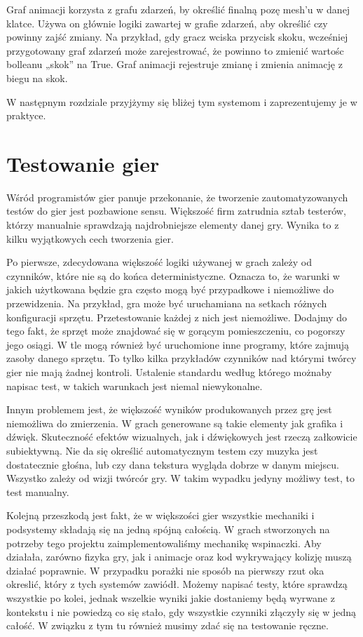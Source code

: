 \documentclass[brudnopis]{xmgr}
\begin{document}
Graf animacji korzysta z grafu zdarzeń, by określić finalną pozę mesh’u w danej klatce. Używa on głównie logiki zawartej w grafie zdarzeń, aby określić czy powinny zajść zmiany. Na przykład, gdy gracz wciska przycisk skoku, wcześniej przygotowany graf zdarzeń może zarejestrować, że powinno to zmienić wartośc bolleanu „skok” na True.  Graf animacji rejestruje zmianę i zmienia animację z biegu na skok.

W następnym rozdziale przyjżymy się bliżej tym systemom i zaprezentujemy je w praktyce.

\chapter{ Testowanie gier}

Wśród programistów gier panuje przekonanie, że tworzenie zautomatyzowanych testów do gier jest pozbawione sensu. Większość firm zatrudnia sztab testerów, którzy manualnie sprawdzają najdrobniejsze elementy danej gry. Wynika to z kilku wyjątkowych cech tworzenia gier.

Po pierwsze, zdecydowana większość logiki używanej w grach zależy od czynników, które nie są do końca deterministyczne. Oznacza to, że warunki w jakich użytkowana będzie gra często mogą być przypadkowe i niemożliwe do przewidzenia. Na przykład, gra może być uruchamiana na setkach różnych konfiguracji sprzętu. Przetestowanie każdej z nich jest niemożliwe. Dodajmy do tego fakt, że sprzęt może znajdować się w gorącym pomieszczeniu, co pogorszy jego osiągi. W tle mogą również być uruchomione inne programy, które zajmują zasoby danego sprzętu. To tylko kilka przykładów czynników nad którymi twórcy gier nie mają żadnej kontroli. Ustalenie standardu według którego możnaby napisac test, w takich warunkach jest niemal niewykonalne.

Innym problemem jest, że większość wyników produkowanych przez grę jest niemożliwa do zmierzenia. 
W grach generowane są takie elementy jak grafika i dźwięk.  Skuteczność efektów wizualnych, jak i dźwiękowych jest rzeczą załkowicie subiektywną. Nie da się określić automatycznym testem czy muzyka jest dostatecznie głośna, lub czy dana tekstura wygląda dobrze w danym miejscu. Wszystko zależy od wizji twórcór gry. W takim wypadku jedyny możliwy test, to test manualny.

Kolejną przeszkodą jest fakt, że w większości gier wszystkie mechaniki i podsystemy składają się na jedną spójną całością. W grach stworzonych na potrzeby tego projektu zaimplementowaliśmy mechanikę wspinaczki. Aby działała, zarówno fizyka gry, jak i animacje oraz kod wykrywający kolizję muszą działać poprawnie. W przypadku porażki nie sposób na pierwszy rzut oka okreslić, który z tych systemów zawiódł. Możemy napisać testy, które sprawdzą wszystkie po kolei, jednak wszelkie wyniki jakie dostaniemy będą wyrwane z kontekstu i nie powiedzą co się stało, gdy wszystkie czynniki złączyły się w jedną całość. W związku z tym tu również musimy zdać się na testowanie ręczne.
\end{document}
